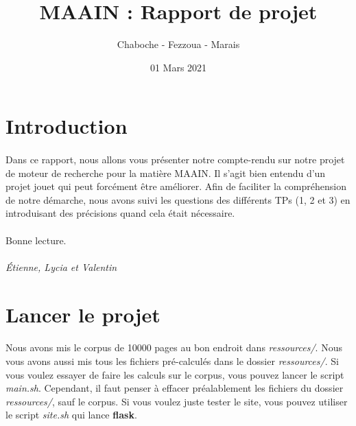 \documentclass[10pt,a4paper]{article}
\author{Chaboche - Fezzoua - Marais}
\title{MAAIN : Rapport de projet}
\date{01 Mars 2021}
\begin{document}
\sffamily

\maketitle
\newpage
\tableofcontents
\newpage



\section{Introduction}
\paragraph{}Dans ce rapport, nous allons vous présenter notre compte-rendu sur notre projet de moteur de recherche pour la matière MAAIN. Il s'agit bien entendu d'un projet jouet qui peut forcément être améliorer. Afin de faciliter la compréhension de notre démarche, nous avons suivi les questions des différents TPs (1, 2 et 3) en introduisant des précisions quand cela était nécessaire. 

\paragraph{}Bonne lecture.

\paragraph{}\textit{Étienne, Lycia et Valentin}




\section{Lancer le projet}
\paragraph{}Nous avons mis le corpus de 10000 pages au bon endroit dans \textit{ressources/}. Nous vous avons aussi mis tous les fichiers pré-calculés dans le dossier \textit{ressources/}. Si vous voulez essayer de faire les calculs sur le corpus, vous pouvez lancer le script \textit{main.sh}. Cependant, il faut penser à effacer préalablement les fichiers du dossier \textit{ressources/}, sauf le corpus. Si vous voulez juste tester le site, vous pouvez utiliser le script \textit{site.sh} qui lance \textbf{flask}.
\end{document}

